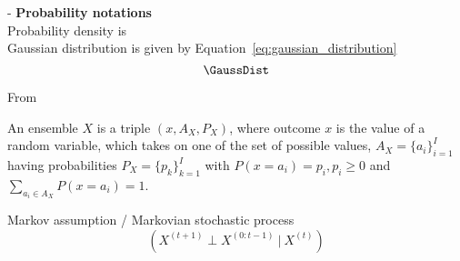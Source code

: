 \noindent
- \textbf{Probability notations}\\
Probability density is \\
Gaussian distribution is given by Equation~\ref{eq:gaussian_distribution}
\begin{equation}
\GaussDist
\label{eq:gaussian_distribution}
\end{equation}

From~\cite{MacKay_Inference_Book}
\begin{definition}
    An ensemble $X$ is a triple $(x, \mathit{A}_X, P_X)$, where outcome $x$ is the value of a random variable, which takes on one of the set of possible values, $\mathit{A}_X = \{a_i\}_{i=1}^I$ having probabilities $\mathit{P}_X = \{p_k\}_{k=1}^I$ with $P(x=a_i)=p_i, p_i \geq 0$ and $\sum_{a_i \in \mathit{A}_X} P(x=a_i) = 1$.
    \label{def:ensemble}
\end{definition}

\begin{definition}
    Markov assumption / Markovian stochastic process
    \begin{equation}
    (X^{(t+1)} \perp X^{(0:t-1)} \: | \: X^{(t)})
    \label{eq:markov_assumption}
    \end{equation}
\end{definition}


